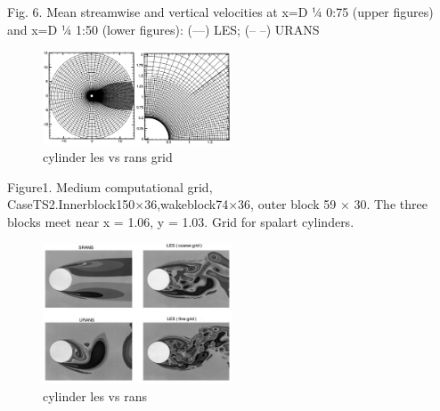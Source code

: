 \documentclass[journal]{new-aiaa}
\begin{document}
Fig. 6. Mean streamwise and vertical velocities at x=D 1⁄4 0:75 (upper figures) and x=D 1⁄4 1:50 (lower figures): (—) LES; (– –) URANS




\begin{figure}[H]
\begin{center}
\includegraphics[width=0.5\textwidth]{Images/logan/travin2000detachededdy_grid.pdf}
\caption{ cylinder les vs rans grid \cite{travin2000detachededdy} }
\label{fig:lesvsranscylindergrid}
\end{center}
\end{figure}

Figure1. Medium computational grid, CaseTS2.Innerblock150×36,wakeblock74×36, outer block 59 × 30. The three blocks meet near x = 1.06, y = 1.03.  Grid for spalart cylinders.


\begin{figure}[H]
\begin{center}
\includegraphics[width=0.5\textwidth]{Images/logan/spalart2000strategies_CylinderLESvsRANS.pdf}
\caption{ cylinder les vs rans \cite{spalart2000strategies} }
\label{fig:lesvsranscylinder}
\end{center}
\end{figure}
\end{document}
